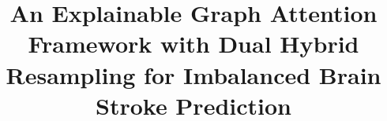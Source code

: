 \documentclass[pdflatex,sn-mathphys-num]{sn-jnl}%
\theoremstyle{thmstyleone}%
\theoremstyle{thmstyletwo}%
\theoremstyle{thmstylethree}%
\begin{document}
\title[GNN-DHRS]
{An Explainable Graph Attention Framework with Dual Hybrid Resampling for Imbalanced Brain Stroke Prediction}







\end{document}
